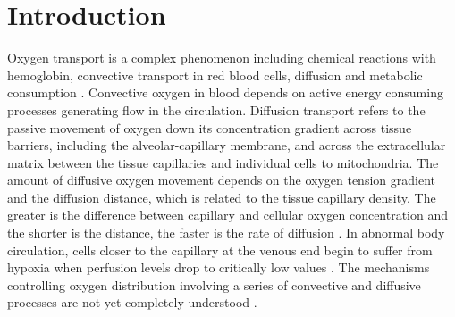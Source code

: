 \documentclass[reqno]{amsart}
\theoremstyle{definition}
\numberwithin{equation}{section}
\begin{document}
\maketitle


\section{Introduction}
\label{s1}

\noindent
Oxygen transport is a complex phenomenon including chemical reactions with hemoglobin, convective transport in red blood cells, diffusion and metabolic consumption \cite{Po,Po2}.
Convective oxygen in blood depends on active energy consuming processes generating flow in the
circulation. Diffusion transport refers to the passive movement of oxygen down its concentration gradient across tissue
barriers, including the alveolar-capillary membrane, and across the extracellular matrix between the tissue capillaries and
individual cells to mitochondria. The amount of diffusive oxygen movement depends on the oxygen tension gradient and the
diffusion distance, which is related to the tissue capillary density. The greater
is the difference between capillary and cellular
oxygen concentration and the shorter is the distance, the faster is the rate of diffusion \cite{LT,WB}.
In abnormal body circulation, cells closer to the capillary at the venous end begin to suffer from hypoxia
when perfusion levels drop to critically low values \cite{G,WB}.
The mechanisms controlling oxygen distribution involving a series of convective and
diffusive processes are not yet completely understood \cite{Po2}.
\end{document}
